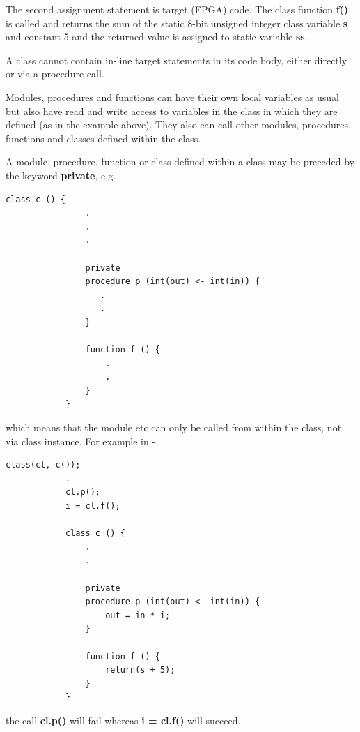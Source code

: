         The second assignment statement is target (FPGA) code. The class
        function {\bf f()} is called and returns the sum of the static 8-bit
        unsigned integer class variable {\bf s} and constant 5 and the returned
        value is assigned to static variable {\bf ss}.
        
        A class cannot contain in-line target statements in its code body,
        either directly or via a procedure call.
        
        Modules, procedures and functions can have their own local variables as
        usual but also have read and write access to variables in the class in
        which they are defined (as in the example above). They also can call
        other modules, procedures, functions and classes defined within the
        class.
        
        A module, procedure, function or class defined within a class may
        be preceded by the keyword {\bf private}, e.g.
        \begin{lstlisting}[gobble=8, language=threepl]
            class c () {
                .
                .
                .
                
                private
                procedure p (int(out) <- int(in)) {
                   .
                   .
                }
                
                function f () {
                    .
                    .
                }
            }
        \end{lstlisting}
        which means that the module etc can only be called from within the class,
        not via class instance. For example in -
        
        \begin{lstlisting}[gobble=8, language=threepl]
            class(cl, c());
            .
            cl.p();
            i = cl.f();
            
            class c () {
                .
                .
                
                private
                procedure p (int(out) <- int(in)) {
                    out = in * i;
                }
                
                function f () {
                    return(s + 5);
                }
            }
        \end{lstlisting}
        the call {\bf cl.p()} will fail whereas {\bf i = cl.f()} will succeed.

